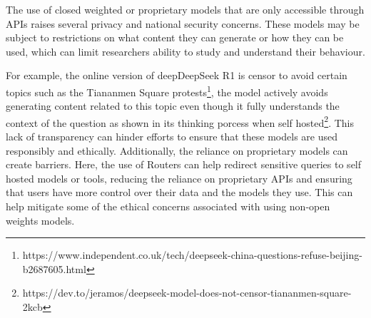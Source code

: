 The use of closed weighted or proprietary models that are only accessible through APIs raises several privacy and national security concerns. These models may be subject to restrictions on what content they can generate or how they can be used, which can limit researchers ability to study and understand their behaviour. 

For example, the online version of deepDeepSeek R1 is censor to avoid certain topics such as the Tiananmen Square protests\footnote{https://www.independent.co.uk/tech/deepseek-china-questions-refuse-beijing-b2687605.html}, the model actively avoids generating content related to this topic even though it fully understands the context of the question as shown in its thinking porcess when self hosted\footnote{https://dev.to/jeramos/deepseek-model-does-not-censor-tiananmen-square-2kcb}. This lack of transparency can hinder efforts to ensure that these models are used responsibly and ethically. Additionally, the reliance on proprietary models can create barriers. Here, the use of Routers can help redirect sensitive queries to self hosted models or tools, reducing the reliance on proprietary APIs and ensuring that users have more control over their data and the models they use. This can help mitigate some of the ethical concerns associated with using non-open weights models.

